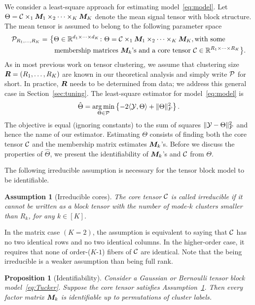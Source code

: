 \documentclass{article}
\newtheorem{prop}{Proposition}
\newtheorem{ass}{Assumption}
\begin{document}
We consider a least-square approach for estimating model~\eqref{eq:model}. Let $\Theta=\mathcal{C}\times_1\bm M_1\times_2\cdots\times_K\bm M_K$ denote the mean signal tensor with block structure. The mean tensor is assumed to belong to the following parameter space
\begin{align}\label{eq:space}
\mathcal{P}_{R_1,\ldots,R_K}=&\ \big\{ \Theta\in\mathbb{R}^{d_1\times \cdots \times d_K}\colon \Theta=\mathcal{C}\times_1\bm M_1\times_2\cdots\times_K\bm M_K, \text{with some}\\
 &\quad \text{membership matrices $\bm M_k$'s and a core tensor $\mathcal{C}\in\mathbb{R}^{R_1\times \cdots \times R_K}$}\big\}.
\end{align}
As in most previous work on tensor clustering, we assume that clustering size $\bm{R}=(R_1,\ldots,R_K)$ are known in our theoretical analysis and simply write $\mathcal{P}$ for short. In practice, $\bm{R}$ needs to be determined from data; we address this general case in Section~\ref{sec:tuning}. The least-square estimator for model~\eqref{eq:model} is
\begin{equation}\label{eq:estimate}
\hat \Theta=\operatorname*{arg\,min}_{\Theta\in\mathcal{P}}\left\{ -2\langle \mathcal{Y},\Theta\rangle + \lVert\Theta\rVert_F^2\right\}.
\end{equation}
The objective is equal (ignoring constants) to the sum of squares $\lVert\mathcal{Y}-\Theta\rVert_F^2$ and hence the name of our estimator. Estimating $\Theta$ consists of finding both the core tensor $\mathcal{C}$ and the membership matrix estimates $\bm M_k$'s. Before we discuss the properties of $\hat \Theta$, we present the identifiability of $\bm M_k$'s and $\mathcal{C}$ from $\Theta$. 

The following irreducible assumption is necessary for the tensor block model to be identifiable. 
\begin{ass}[Irreducible cores]\label{ass:core}
The core tensor $\mathcal{C}$ is called irreducible if it cannot be written as a block tensor with the number of mode-$k$ clusters smaller than $R_k$, for any $k\in[K]$. 
\end{ass}
In the matrix case $(K=2)$, the assumption is equivalent to saying that $\mathcal{C}$ has no two identical rows and no two identical columns. In the higher-order case, it requires that none of order-($K$-$1$) fibers of $\mathcal{C}$ are identical. Note that the being irreducible is a weaker assumption than being full rank. 

\begin{prop}[Identifiability]\label{prop:factors}
Consider a Gaussian or Bernoulli tensor block model~\eqref{eq:Tucker}. Suppose the core tensor satisfies Assumption~\ref{ass:core}. Then every factor matrix $\bm M_k$ is identifiable up to permutations of cluster labels. 
\end{prop}
\end{document}
